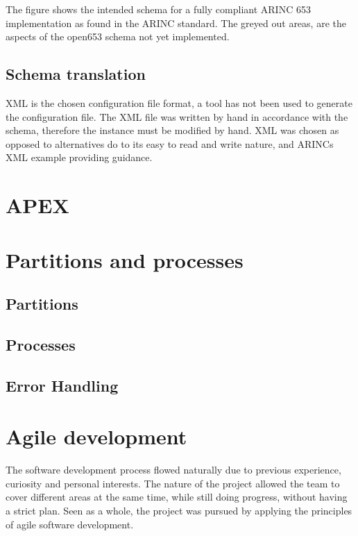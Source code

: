 The figure shows the intended schema for a fully compliant ARINC 653 implementation as found in the ARINC standard.  The greyed out areas, are the aspects of the open653 schema not yet implemented. 

\subsection{Schema translation}


XML is the chosen configuration file format, a tool has not been used to generate the configuration file. The XML file was written by hand in accordance with the schema, therefore the instance must be modified by hand. XML was chosen as opposed to alternatives do to its easy to read and write nature, and ARINC\textquotesingle s XML example providing guidance.


\section{APEX}

\section{Partitions and processes}

\subsection{Partitions}

\subsection{Processes}

\subsection{Error Handling}

\section{Agile development}
The software development process flowed naturally due to previous 
experience, curiosity and personal interests. The nature of the project
allowed the team to cover different areas at the same time, while still
doing progress, without having a strict plan. Seen as a whole, the project
was pursued by applying the principles of agile software development.

